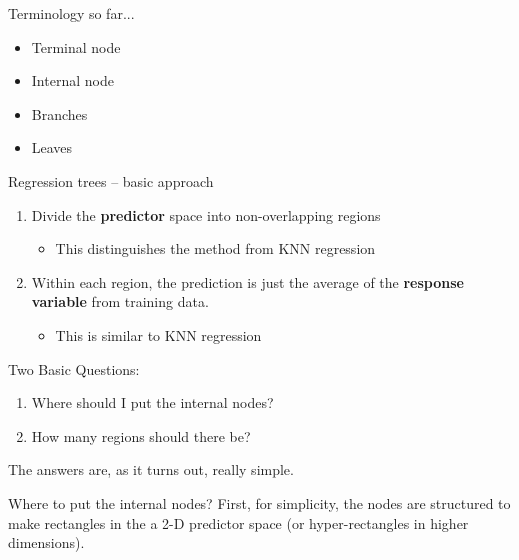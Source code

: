 \documentclass[mathserif, aspectratio=169]{beamer}
\begin{document}
\begin{frame}{Terminology so far...}
	\begin{itemize}
		\item Terminal node
		\item Internal node
		\item Branches
		\item Leaves
	\end{itemize}
\end{frame}

\begin{frame}{Regression trees -- basic approach}

\begin{enumerate}
\item Divide the \textbf{predictor} space into non-overlapping regions
\begin{itemize}
\item This distinguishes the method from KNN regression
\end{itemize}
\item Within each region, the prediction is just the average of the \textbf{response variable} from training data.
\begin{itemize}
\item This is similar to KNN regression
\end{itemize}
\end{enumerate}

\pause

Two Basic Questions:

\begin{enumerate}
\item Where should I put the internal nodes?
\item How many regions should there be?
\end{enumerate}

The answers are, as it turns out, really simple.  

\end{frame}

\begin{frame}{Where to put the internal nodes?}
First, for simplicity, the nodes are structured to make rectangles in the a 2-D predictor space (or hyper-rectangles in higher dimensions).  

\end{frame}
\end{document}
